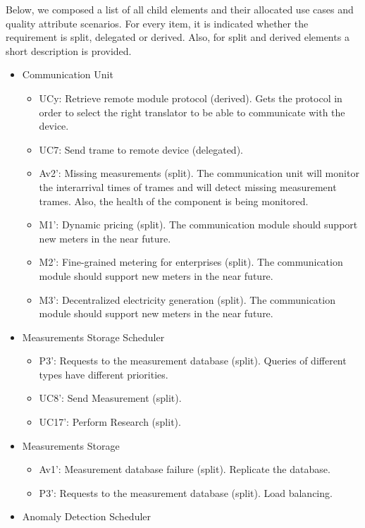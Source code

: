 \npar Below, we composed a list of all child elements and their allocated use
cases and quality attribute scenarios. For every item, it is indicated whether
the requirement is split, delegated or derived. Also, for split and derived
elements a short description is provided.

\begin{itemize}
	\item Communication Unit
	\begin{itemize}
	  	\item UCy: Retrieve remote module protocol (derived). Gets the protocol in
	  	order to select the right translator to be able to communicate with the device. 
		\item UC7: Send trame to remote device (delegated). 
		\item Av2': Missing measurements (split). The communication unit will monitor
		the interarrival times of trames and will detect missing measurement trames.
		Also, the health of the component is being monitored.
		\item M1': Dynamic pricing (split). The communication module should support
		new meters in the near future. 
		\item M2': Fine-grained metering for enterprises (split). The communication
		module should support new meters in the near future. 
		\item M3': Decentralized electricity generation (split). The communication
		module should support new meters in the near future.
	\end{itemize}
	\item Measurements Storage Scheduler
	\begin{itemize}
		\item P3': Requests to the measurement database (split). Queries of different
		types have different priorities.
		\item UC8': Send Measurement (split). 
		\item UC17': Perform Research (split). 
	\end{itemize}
	\item Measurements Storage
	\begin{itemize}
		\item Av1': Measurement database failure (split). Replicate the database.
	  	\item P3': Requests to the measurement database (split). Load balancing.
	\end{itemize}
	\item Anomaly Detection Scheduler
	\begin{itemize}

\end{itemize}
\end{itemize}
